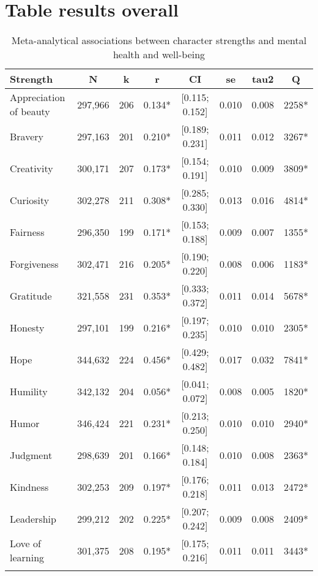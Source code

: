 \documentclass[
  man,floatsintext]{apa6}
\begin{document}
\newpage

\hypertarget{table-results-overall}{%
\section{Table results overall}\label{table-results-overall}}

\begin{table}

\caption{\label{tab:unnamed-chunk-9}Meta-analytical associations between character strengths and mental health and well-being}
\centering
\begin{tabular}[t]{lccccccc}
\toprule
Strength & N & k & r & CI & se & tau2 & Q\\
\midrule
Appreciation of beauty & 297,966 & 206 & 0.134* & {}[0.115; 0.152] & 0.010 & 0.008 & 2258*\\
Bravery & 297,163 & 201 & 0.210* & {}[0.189; 0.231] & 0.011 & 0.012 & 3267*\\
Creativity & 300,171 & 207 & 0.173* & {}[0.154; 0.191] & 0.010 & 0.009 & 3809*\\
Curiosity & 302,278 & 211 & 0.308* & {}[0.285; 0.330] & 0.013 & 0.016 & 4814*\\
Fairness & 296,350 & 199 & 0.171* & {}[0.153; 0.188] & 0.009 & 0.007 & 1355*\\
\addlinespace
Forgiveness & 302,471 & 216 & 0.205* & {}[0.190; 0.220] & 0.008 & 0.006 & 1183*\\
Gratitude & 321,558 & 231 & 0.353* & {}[0.333; 0.372] & 0.011 & 0.014 & 5678*\\
Honesty & 297,101 & 199 & 0.216* & {}[0.197; 0.235] & 0.010 & 0.010 & 2305*\\
Hope & 344,632 & 224 & 0.456* & {}[0.429; 0.482] & 0.017 & 0.032 & 7841*\\
Humility & 342,132 & 204 & 0.056* & {}[0.041; 0.072] & 0.008 & 0.005 & 1820*\\
\addlinespace
Humor & 346,424 & 221 & 0.231* & {}[0.213; 0.250] & 0.010 & 0.010 & 2940*\\
Judgment & 298,639 & 201 & 0.166* & {}[0.148; 0.184] & 0.010 & 0.008 & 2363*\\
Kindness & 302,253 & 209 & 0.197* & {}[0.176; 0.218] & 0.011 & 0.013 & 2472*\\
Leadership & 299,212 & 202 & 0.225* & {}[0.207; 0.242] & 0.009 & 0.008 & 2409*\\
Love of learning & 301,375 & 208 & 0.195* & {}[0.175; 0.216] & 0.011 & 0.011 & 3443*\\
\addlinespace

\end{tabular}
\end{table}
\end{document}
